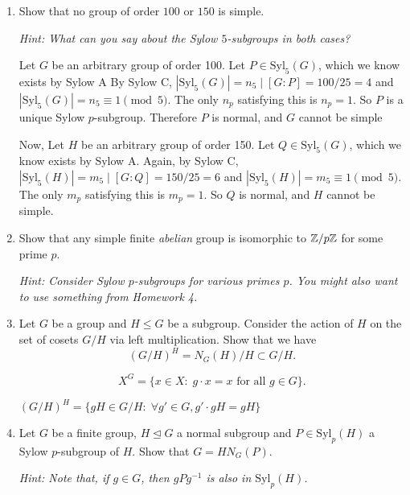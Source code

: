\documentclass{amsart}
\begin{document}
\begin{enumerate}[itemsep=0.15in]

\item Show that no group of order $100$ or $150$ is simple.

\emph{Hint: What can you say about the Sylow $5$-subgroups in both cases?}

Let $G$ be an arbitrary group of order 100. Let $P\in\mathrm{Syl}_5(G)$, which we know exists by Sylow A
By Sylow C, $|\mathrm{Syl}_5(G)|=n_5\mid[G:P]=100/25=4$ and $|\mathrm{Syl}_5(G)|=n_5\equiv1\pmod{5}$. The only $n_p$ satisfying this is $n_p=1$. So $P$ is a unique Sylow $p$-subgroup. Therefore $P$ is normal, and $G$ cannot be simple

Now, Let $H$ be an arbitrary group of order 150. Let $Q\in\mathrm{Syl}_5(G)$, which we know exists by Sylow A. Again, by Sylow C, $|\mathrm{Syl}_5(H)|=m_5\mid[G:Q]=150/25=6$ and $|\mathrm{Syl}_5(H)|=m_5\equiv1\pmod{5}$. The only $m_p$ satisfying this is $m_p=1$. So $Q$ is normal, and $H$ cannot be simple.

\vspace{0.2in}

\item Show that any simple finite \emph{abelian} group is isomorphic to $\mathbb{Z}/p\mathbb{Z}$ for some prime $p$.

\emph{Hint: Consider Sylow $p$-subgroups for various primes $p$. You might also want to use something from Homework 4.}



\vspace{0.2in}

\item Let $G$ be a group and $H\leq G$ be a subgroup. Consider the action of $H$ on the set of cosets $G/H$ via left multiplication. Show that we have
\[
	(G/H)^H = N_G(H)/H\subset G/H.
\]

\[
X^G = \{x\in X:\; g\cdot x = x\text{ for all $g\in G$}\}.
\]

$(G/H)^H=\{gH\in G/H:\;\forall g'\in G,g'\cdot gH=gH\}$





\vspace{0.2in}

\item Let $G$ be a finite group, $H\unlhd G$ a normal subgroup and $P\in \mathrm{Syl}_p(H)$ a Sylow $p$-subgroup of $H$. Show that $G = HN_G(P)$.

\emph{Hint: Note that, if $g\in G$, then $gPg^{-1}$ is also in $\mathrm{Syl}_p(H)$.}


\end{enumerate}
\end{document}
